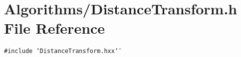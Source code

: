 \section{Algorithms/Distance\-Transform.h File Reference}
\label{DistanceTransform_8h}
{\tt \#include \char`\"{}Distance\-Transform.hxx\char`\"{}}\par
